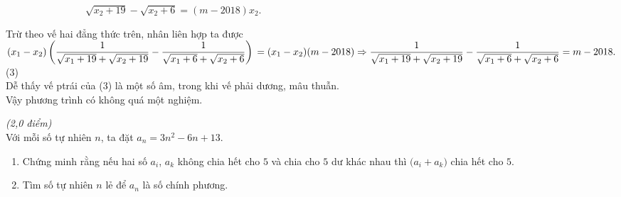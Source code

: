 \begin{ex}
{\begin{enumerate}
\begin{center}
	$\quad\quad\quad\quad\quad\quad\quad\quad\sqrt{x_2+19}-\sqrt{x_2+6}=(m-2018)x_2$.\\
\end{center}
 Trừ theo vế hai đẳng thức trên, nhân liên hợp ta được\\
$(x_1-x_2)\left(\dfrac{1}{\sqrt{x_1+19}+\sqrt{x_2+19}}-\dfrac{1}{\sqrt{x_1+6}+\sqrt{x_2+6}} \right) \\=(x_1-x_2)(m-2018)\\\Rightarrow \dfrac{1}{\sqrt{x_1+19}+\sqrt{x_2+19}}-\dfrac{1}{\sqrt{x_1+6}+\sqrt{x_2+6}}=m-2018.$\hfill(3)\\
Dễ thấy vế ptrái của (3) là một số âm, trong khi vế phải dương, mâu thuẫn.\\
Vậy phương trình có không quá một nghiệm.
\end{enumerate}
}
\end{ex}
\begin{ex}%
	{\it{(2,0 điểm)}}\\
	Với mỗi số tự nhiên $n$, ta đặt $a_n = 3n^2 - 6n + 13$.
	\begin{enumerate}
		\item Chứng minh rằng nếu hai số $a_i$, $a_k$ không chia hết cho $5$ và chia cho $5$ dư khác nhau thì $\big(a_i + a_k\big)$ chia hết cho $5$.
		\item Tìm số tự nhiên $n$ lẻ để $a_n$ là số chính phương.
	\end{enumerate}
\end{ex}
